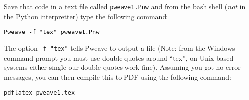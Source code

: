 Save that code in a text file called \lstinline!pweave1.Pnw! and from
the bash shell (\emph{not} in the Python interpretter) type the
following command:

\begin{lstlisting}
Pweave -f "tex" pweave1.Pnw
\end{lstlisting}
The option \lstinline!-f "tex"! tells Pweave to output a file (Note:
from the Windows command prompt you must use double quotes around
``tex'', on Unix-based systems either single our double quotes work
fine). Assuming you got no error messages, you can then compile this to
PDF using the following command:

\begin{lstlisting}
pdflatex pweave1.tex
\end{lstlisting}
